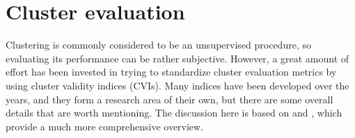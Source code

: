 %
%
%
%
%
%
%

\section{Cluster evaluation}
\label{sec:evaluation}

Clustering is commonly considered to be an unsupervised procedure,
so evaluating its performance can be rather subjective.
However, a great amount of effort has been invested in trying to standardize cluster evaluation metrics by using cluster validity indices (CVIs).
Many indices have been developed over the years,
and they form a research area of their own,
but there are some overall details that are worth mentioning.
The discussion here is based on \citet{arbelaitz2013} and \citet{wang2007},
which provide a much more comprehensive overview.

